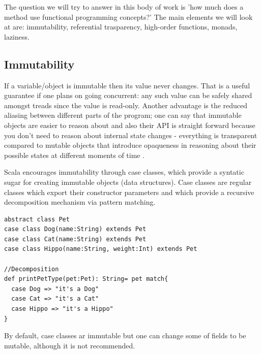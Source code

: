 \documentclass{article}
\begin{document}
The question we will try to answer in this body of work is 'how much does a method use functional programming concepts?' The main elements we will look at are: immutability, referential trasparency, high-order functions, monads, laziness.


\subsection {Immutability}
If a variable/object is immutable then its value never changes. That is a useful guarantee if one plans on going concurrent: any such value can be safely shared amongst treads since the value is read-only. Another advantage is the reduced aliasing between different parts of the program; one can say that immutable objects are easier to reason about and also their API is straight forward because you don't need to reason about internal state changes - everything is transparent compared to mutable objects that introduce opaqueness in reasoning about their possible states at different moments of time . \par
Scala encourages immutability through case classes, which provide a syntatic sugar for creating immutable objects (data structures). Case classes are regular classes which export their constructor parameters and which provide a recursive decomposition mechanism via pattern matching.

\begin{lstlisting} 
abstract class Pet
case class Dog(name:String) extends Pet 
case class Cat(name:String) extends Pet
case class Hippo(name:String, weight:Int) extends Pet

//Decomposition
def printPetType(pet:Pet): String= pet match{
  case Dog => "it's a Dog"
  case Cat => "it's a Cat"
  case Hippo => "it's a Hippo"
}
\end{lstlisting}

By default, case classes ar immutable but one can change some of fields to be mutable, although it is not recommended.\par
\end{document}
